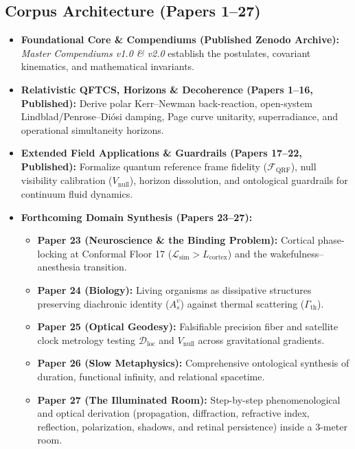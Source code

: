 \documentclass[11pt,a4paper]{article}
\begin{document}
\subsection{Corpus Architecture (Papers 1--27)}
\begin{itemize}[leftmargin=1.5em]
    \item \textbf{Foundational Core \& Compendiums (Published Zenodo Archive):} \textit{Master Compendiums v1.0 \& v2.0} establish the postulates, covariant kinematics, and mathematical invariants.
    \item \textbf{Relativistic QFTCS, Horizons \& Decoherence (Papers 1--16, Published):} Derive polar Kerr--Newman back-reaction, open-system Lindblad/Penrose--Diósi damping, Page curve unitarity, superradiance, and operational simultaneity horizons.
    \item \textbf{Extended Field Applications \& Guardrails (Papers 17--22, Published):} Formalize quantum reference frame fidelity ($\mathcal{F}_{\text{QRF}}$), null visibility calibration ($V_{\text{null}}$), horizon dissolution, and ontological guardrails for continuum fluid dynamics.
    \item \textbf{Forthcoming Domain Synthesis (Papers 23--27):}
    \begin{itemize}
        \item \textbf{Paper 23 (Neuroscience \& the Binding Problem):} Cortical phase-locking at Conformal Floor 17 ($\mathcal{L}_{\text{sim}} > L_{\text{cortex}}$) and the wakefulness--anesthesia transition.
        \item \textbf{Paper 24 (Biology):} Living organisms as dissipative structures preserving diachronic identity ($A_s^v$) against thermal scattering ($\Gamma_{\text{th}}$).
        \item \textbf{Paper 25 (Optical Geodesy):} Falsifiable precision fiber and satellite clock metrology testing $\mathcal{D}_{\text{loc}}$ and $V_{\text{null}}$ across gravitational gradients.
        \item \textbf{Paper 26 (Slow Metaphysics):} Comprehensive ontological synthesis of duration, functional infinity, and relational spacetime.
        \item \textbf{Paper 27 (The Illuminated Room):} Step-by-step phenomenological and optical derivation (propagation, diffraction, refractive index, reflection, polarization, shadows, and retinal persistence) inside a 3-meter room.
    \end{itemize}
\end{itemize}
\end{document}
